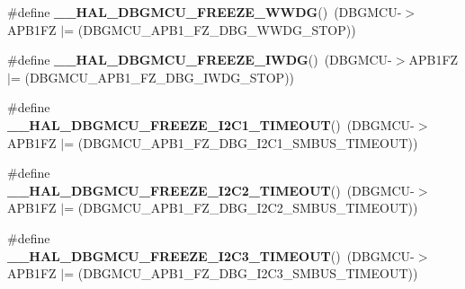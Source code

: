 \begin{DoxyCompactItemize}
\item 
\mbox{\label{group___h_a_l___exported___macros_ga81215154725c479c67fb1adac906fbd9}} 
\#define {\bfseries \+\_\+\+\_\+\+H\+A\+L\+\_\+\+D\+B\+G\+M\+C\+U\+\_\+\+F\+R\+E\+E\+Z\+E\+\_\+\+W\+W\+DG}()~(D\+B\+G\+M\+CU-\/$>$A\+P\+B1\+FZ $\vert$= (D\+B\+G\+M\+C\+U\+\_\+\+A\+P\+B1\+\_\+\+F\+Z\+\_\+\+D\+B\+G\+\_\+\+W\+W\+D\+G\+\_\+\+S\+T\+OP))
\item 
\mbox{\label{group___h_a_l___exported___macros_gabab7ab631ba58fb6246a9385e8af9d0d}} 
\#define {\bfseries \+\_\+\+\_\+\+H\+A\+L\+\_\+\+D\+B\+G\+M\+C\+U\+\_\+\+F\+R\+E\+E\+Z\+E\+\_\+\+I\+W\+DG}()~(D\+B\+G\+M\+CU-\/$>$A\+P\+B1\+FZ $\vert$= (D\+B\+G\+M\+C\+U\+\_\+\+A\+P\+B1\+\_\+\+F\+Z\+\_\+\+D\+B\+G\+\_\+\+I\+W\+D\+G\+\_\+\+S\+T\+OP))
\item 
\mbox{\label{group___h_a_l___exported___macros_ga6160f642dcff812be3a04c5b5c66e31d}} 
\#define {\bfseries \+\_\+\+\_\+\+H\+A\+L\+\_\+\+D\+B\+G\+M\+C\+U\+\_\+\+F\+R\+E\+E\+Z\+E\+\_\+\+I2\+C1\+\_\+\+T\+I\+M\+E\+O\+UT}()~(D\+B\+G\+M\+CU-\/$>$A\+P\+B1\+FZ $\vert$= (D\+B\+G\+M\+C\+U\+\_\+\+A\+P\+B1\+\_\+\+F\+Z\+\_\+\+D\+B\+G\+\_\+\+I2\+C1\+\_\+\+S\+M\+B\+U\+S\+\_\+\+T\+I\+M\+E\+O\+UT))
\item 
\mbox{\label{group___h_a_l___exported___macros_gacc31f8475c2e3e30ee99e53814faa523}} 
\#define {\bfseries \+\_\+\+\_\+\+H\+A\+L\+\_\+\+D\+B\+G\+M\+C\+U\+\_\+\+F\+R\+E\+E\+Z\+E\+\_\+\+I2\+C2\+\_\+\+T\+I\+M\+E\+O\+UT}()~(D\+B\+G\+M\+CU-\/$>$A\+P\+B1\+FZ $\vert$= (D\+B\+G\+M\+C\+U\+\_\+\+A\+P\+B1\+\_\+\+F\+Z\+\_\+\+D\+B\+G\+\_\+\+I2\+C2\+\_\+\+S\+M\+B\+U\+S\+\_\+\+T\+I\+M\+E\+O\+UT))
\item 
\mbox{\label{group___h_a_l___exported___macros_gacd3fd0373b45de1b86be07bd4007c30e}} 
\#define {\bfseries \+\_\+\+\_\+\+H\+A\+L\+\_\+\+D\+B\+G\+M\+C\+U\+\_\+\+F\+R\+E\+E\+Z\+E\+\_\+\+I2\+C3\+\_\+\+T\+I\+M\+E\+O\+UT}()~(D\+B\+G\+M\+CU-\/$>$A\+P\+B1\+FZ $\vert$= (D\+B\+G\+M\+C\+U\+\_\+\+A\+P\+B1\+\_\+\+F\+Z\+\_\+\+D\+B\+G\+\_\+\+I2\+C3\+\_\+\+S\+M\+B\+U\+S\+\_\+\+T\+I\+M\+E\+O\+UT))
\item 
\mbox{\label{group___h_a_l___exported___macros_ga1d225003f36f6a22ffea1a41a4a78cec}} 

\end{DoxyCompactItemize}
